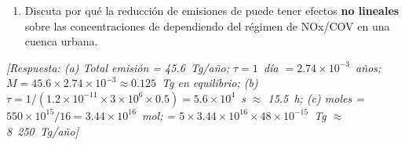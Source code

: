\begin{bloque_ejercicios}
\begin{ejercicios}
\begin{enumerate}[label=\alph*)]
    \item Discuta por qu\'e la reducci\'on de emisiones de
           puede tener efectos \textbf{no lineales}
          sobre las concentraciones de  dependiendo
          del r\'egimen de NOx/COV en una cuenca urbana.
\end{enumerate}

\textit{[Respuesta:
(a) Total emisi\'on = 45.6~Tg/a\~no;
    $\tau = 1$~d\'ia $= 2.74\times10^{-3}$~a\~nos;
    $M = 45.6\times2.74\times10^{-3}
    \approx 0.125$~Tg en equilibrio;
(b) $\tau = 1/(1.2\times10^{-11}\times3\times10^6
    \times0.5) = 5.6\times10^4$~s $\approx$ 15.5~h;
(c) moles  = $550\times10^{15}/16
    = 3.44\times10^{16}$~mol;
     = $5\times3.44\times10^{16}\times48\times10^{-15}$~Tg
    $\approx$ 8~250~Tg/a\~no]}

\end{ejercicios}

\end{bloque_ejercicios}
